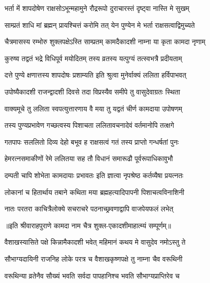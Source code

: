 \twolineshloka
{भर्ता में शापदोषेण राक्षसोऽभून्महामुने}
{रौद्ररूपो दुराचारस्तं दृष्ट्वा नास्ति मे सुखम्} %

\twolineshloka
{साम्प्रतं शाधि मां ब्रह्मन् प्रायश्चित्तं करोमि तत्}
{येन पुण्येन मे भर्ता राक्षसत्वाद्विमुच्यते} %


\twolineshloka
{चैत्रमासस्य रम्भोरु शुक्लपक्षेऽस्ति साम्प्रतम्}
{कामदैकादशी नाम्ना या कृता कामदा नृणाम्} %

\twolineshloka
{कुरुष्व तद्वतं भद्रे विधिपूर्व मयोदितम्}
{तस्य व्रतस्य यत्पुग्यं तत्स्वभत्रै प्रदीयताम्} %

\twolineshloka
{दत्ते पुण्ये क्षणात्तस्य शापदोषः प्रशाम्यति}
{इति श्रुत्वा मुनेर्वाक्यं ललिता हर्विपाभवत्} %

\twolineshloka
{उपोष्यैकादशी राजन्द्वादशी दिवसे तदा}
{विप्रस्यैव समीपे तु वासुदेवाग्रतः स्थिता} %

\twolineshloka
{वाक्यमूचे तु ललिता स्वपत्युत्तारणाय वै}
{मया तु यद्वतं चीर्ण कामदाया उपोषणम्} %

\twolineshloka
{तस्य पुण्यप्रभावेण गच्छत्वस्य पिशाचता}
{ललितावचनादेवं वर्तमानोपि तत्क्षगे} %

\twolineshloka
{गतपापः सललितो दिव्य देहो बभूव ह}
{राक्षसत्वं गतं तस्य प्राप्तो गन्धर्षतां पुनः} %

\twolineshloka
{हेमरत्नसमाकीणों रेमे ललितया सह}
{तौ विधानं समारूढौ पूर्वरूपाधिकावुभौ} %

\twolineshloka
{दम्पती चापि शोभेता कामदायाः प्रभावतः}
{इति ज्ञात्वा नृपश्रेष्ठ कर्तव्यैषा प्रयत्नतः} %

\twolineshloka
{लोकानां च हितार्थाय तबाने कथिता मया}
{ब्रह्महत्यादिपापनी पिशाचत्वविनाशिनी} %

\twolineshloka
{नातः परतरा काचित्रैलोक्ये सचराचरे}
{पठनाच्छ्रवणाद्वापि वाजपेयफलं लभेत्} %

॥इति श्रीवाराहपुराणे कामदा नाम चैत्र शुक्ल-एकादशीमाहात्म्यं सम्पूर्णम्॥



\twolineshloka
{वैशाखस्यासिते पक्षे किन्नामैकादशी भवेत्}
{महिमानं कथय मे वासुदेव नमोऽस्तु ते} %


\twolineshloka
{सौभाग्यदायिनी राजनिह लोके परत्र च}
{वैशाखकृष्णपक्षे तु नाम्ना चैव वरूथिनी} %

\twolineshloka
{वरूथिन्या व्रतेनैव सौख्यं भवति सर्वदा}
{पापहानिश्च भवति सौभाग्यप्राप्तिरेव च} %

